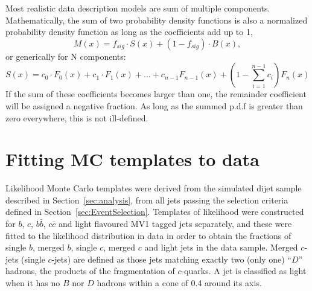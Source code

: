 Most realistic data description models are sum of multiple components. Mathematically, the sum of two probability density functions is  also a normalized probability density function as  long as the coefficients add up to 1, %
%
\begin{equation}
M(x) = f_{sig} \cdot S(x) + (1-f_{sig}) \cdot B(x),
\end{equation}
%
or generically for N components:
%
\begin{equation}
S(x) = c_0 \cdot F_0(x) + c_1 \cdot F_1(x)+...+c_{n-1}F_{n-1}(x)+ (1-\sum^{n-1}_{i=1}c_i) F_n(x)
\end{equation}
%
If the sum of these coefficients becomes larger than one, the remainder coefficient will be assigned a negative fraction. As long as the summed p.d.f is greater than zero everywhere, this is not ill-defined. %







\section{Fitting MC templates to data}\label{sec:FitsResults}



Likelihood Monte Carlo templates were derived from the simulated dijet sample described in Section~\ref{sec:analysis}, from all jets passing the selection criteria defined in Section~\ref{sec:EventSelection}. Templates of likelihood were constructed for $b$, $c$, $b\bar{b}$, $c\bar{c}$ and light flavoured MV1 tagged jets separately, and these were fitted to the likelihood distribution in data in order to obtain the fractions of single $b$, merged $b$, single $c$, merged $c$ and light jets in the data sample. Merged $c$-jets (single $c$-jets) are defined as those jets matching exactly two (only one) ``$D$'' hadrons, the products of the fragmentation of $c$-quarks. A jet is classified as light when it has no $B$ nor $D$ hadrons within a cone of 0.4 around its axis.

